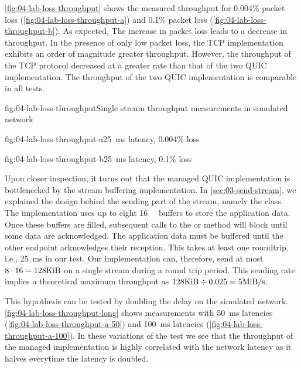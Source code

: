 \autoref{fig:04-lab-loss-throughput} shows the measured throughput for 0.004\% packet loss
(\autoref{fig:04-lab-loss-throughput-a}) and 0.1\% packet loss
(\autoref{fig:04-lab-loss-throughput-b}). As expected, The increase in packet loss leads to a
decrease in throughput. In the presence of only low packet loss, the TCP implementation exhibits an
order of magnitude greater throughput. However, the throughput of the TCP protocol decreased at a
greater rate than that of the two QUIC implementation. The throughput of the two QUIC implementation
is comparable in all tests.

\begin{myFigure}{fig:04-lab-loss-throughput}{Single stream throughput measurements in simulated network}
\begin{mySubfigure}{0.49\linewidth}{fig:04-lab-loss-throughput-a}{\SI{25}{\milli\second} latency, 0.004\% loss}
\footnotesize

\end{mySubfigure}
\begin{mySubfigure}{0.49\linewidth}{fig:04-lab-loss-throughput-b}{\SI{25}{\milli\second} latency, 0.1\% loss}
\footnotesize

\end{mySubfigure}
\end{myFigure}

Upon closer inspection, it turns out that the managed QUIC implementation is bottlenecked by the
stream buffering implementation. In \autoref{sec:03-send-stream}, we explained the design behind the
sending part of the stream, namely the \SendStream{} class. The implementation uses up to eight
\SI{16}{\kibi\byte} buffers to store the application data. Once these buffers are filled, subsequent
calls to the  or  method will block until some data are
acknowledged. The application data must be buffered until the other endpoint acknowledges their
reception. This takes at least one roundtrip, i.e., \SI{25}{\milli\second} in our test. Our
implementation can, therefore, send at most $8 \cdot 16 = 128 \si{\kibi\byte}$ on a single stream during
a round trip period. This sending rate implies a theoretical maximum throughput as
$128\si{\kibi\byte} \div 0.025 = 5 \si[per-mode=symbol]{\mebi\byte\per\second}$.

This hypothesis can be tested by doubling the delay on the simulated network.
\autoref{fig:04-lab-loss-throughput-long} shows measurements with \SI{50}{\milli\second} latencies
(\autoref{fig:04-lab-loss-throughput-a-50}) and \SI{100}{\milli\second} latencies
(\autoref{fig:04-lab-loss-throughput-a-100}). In these variations of the test we see that the
throughput of the managed implementation is highly correlated with the network latency as it halves
everytime the latency is doubled.

